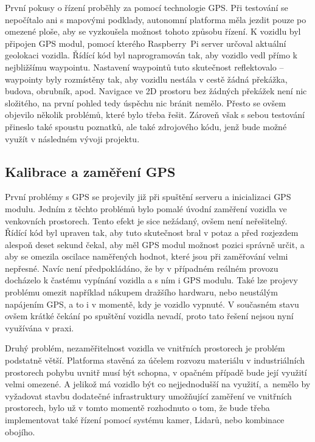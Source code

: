 \documentclass[czech, bachelor]{diploma}
\begin{document}
První pokusy o řízení proběhly za pomocí technologie GPS. Při testování se nepočítalo ani s mapovými podklady, autonomní platforma
měla jezdit pouze po omezené ploše, aby se vyzkoušela možnost tohoto způsobu řízení. K vozidlu byl připojen GPS modul, pomocí
kterého Raspberry~Pi server určoval aktuální geolokaci vozidla. Řídící kód byl naprogramován tak, aby vozidlo vedl přímo
k nejbližšímu waypointu. Nastavení waypointů tuto skutečnost reflektovalo -- waypointy byly rozmístěny tak, aby vozidlu nestála
v cestě žádná překážka, budova, obrubník, apod. Navigace ve 2D prostoru bez žádných překážek není nic složitého, na první pohled
tedy úspěchu nic bránit nemělo. Přesto se ovšem objevilo několik problémů, které bylo třeba řešit. Zároveň však s sebou testování
přineslo také spoustu poznatků, ale také zdrojového kódu, jenž bude možné využít v následném vývoji projektu.

\subsection{Kalibrace a zaměření GPS}

První problémy s GPS se projevily již při spuštění serveru a inicializaci GPS modulu. Jedním z těchto problémů bylo pomalé úvodní
zaměření vozidla ve venkovních prostorech. Tento efekt je sice nežádaný, ovšem není neřešitelný. Řídící kód byl upraven tak, aby
tuto skutečnost bral v potaz a před rozjezdem alespoň deset sekund čekal, aby měl GPS modul možnost pozici správně určit, a aby se
omezila oscilace naměřených hodnot, které jsou při zaměřování velmi nepřesné. Navíc není předpokládáno, že by v případném reálném
provozu docházelo k častému vypínání vozidla a s ním i GPS modulu. Také lze projevy problému omezit například nákupem dražšího
hardwaru, nebo neustálým napájením GPS, a to i v momentě, kdy je vozidlo vypnuté. V současném stavu ovšem krátké čekání
po spuštění vozidla nevadí, proto tato řešení nejsou nyní využívána v praxi.

Druhý problém, nezaměřitelnost vozidla ve vnitřních prostorech je problém podstatně větší. Platforma stavěná za účelem rozvozu
materiálu v industriálních prostorech pohybu uvnitř musí být schopna, v opačném případě bude její využití velmi omezené. A jelikož
má vozidlo být co nejjednodušší na využití, a~nemělo by vyžadovat stavbu dodatečné infrastruktury umožňující zaměření ve vnitřních
prostorech, bylo už v tomto momentě rozhodnuto o tom, že bude třeba implementovat také řízení pomocí systému kamer, Lidarů, nebo
kombinace obojího.
\end{document}

